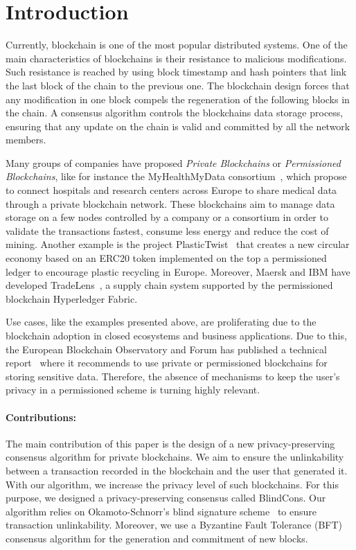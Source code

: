 \documentclass[conference]{llncs}
\newcommand{\name}{BlindCons}
\begin{document}
\section{Introduction} \label{intro}

Currently, blockchain is one of the most popular distributed systems. One of the main characteristics of blockchains is their resistance to malicious modifications. Such resistance is reached by using block timestamp and hash pointers that link the last block of the chain to the previous one. The blockchain design forces that any modification in one block compels the regeneration of the following blocks in the chain. A consensus algorithm controls the blockchains data storage process, ensuring that any update on the chain is valid and committed by all the network members.

Many groups of companies have proposed \emph{Private Blockchains} or \emph{Permissioned Blockchains}, like for instance the MyHealthMyData  consortium~\cite{MHMD}, which propose to connect hospitals and research centers across Europe to share medical data through a private blockchain network. These blockchains aim to manage data storage on a few nodes controlled by a company or a consortium in order to validate the transactions fastest, consume less energy and reduce the cost of mining. Another example is the project PlasticTwist~\cite{PTWIST} that creates a new circular economy based on an ERC20 token implemented on the top a permissioned ledger to encourage plastic recycling in Europe. Moreover, Maersk and IBM have developed TradeLens~\cite{Tradelens}, a supply chain system supported by the permissioned blockchain Hyperledger Fabric.  

Use cases, like the examples presented above, are proliferating due to the blockchain adoption in closed ecosystems and business applications. Due to this, the European Blockchain Observatory and Forum has published a technical report~\cite{BlockchainGDPR} where it recommends to use private or permissioned blockchains for storing sensitive data. Therefore, the absence of mechanisms to keep the user's privacy in a permissioned scheme is turning highly relevant.


\paragraph*{Contributions:} The main contribution of this paper is the design of a new privacy-preserving consensus algorithm for private blockchains. We aim to ensure the unlinkability between a transaction recorded in the blockchain and the user that generated it. With our algorithm, we increase the privacy level of such blockchains. For this purpose, we designed a privacy-preserving consensus called \name{}. Our algorithm relies on Okamoto-Schnorr's blind signature scheme~\cite{okamoto1992provably} to ensure transaction unlinkability. Moreover, we use a Byzantine Fault Tolerance (BFT) consensus algorithm for the generation and commitment of new blocks.
\end{document}
